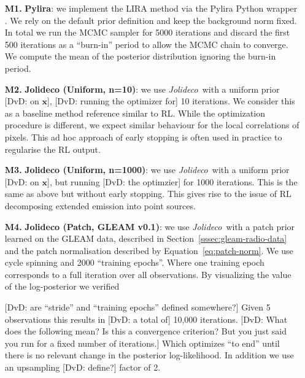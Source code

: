 \documentclass[twocolumn]{aastex631}
\newcommand{\jolideco}{\textit{Jolideco}~}
\newcommand{\dvd}[1]{{\color{red} [DvD: #1]}}
\begin{document}
    \begin{enumerate}

        \item[\bf M1.] \textbf{Pylira}: we implement the LIRA method \citep{Esch2004} via the Pylira Python wrapper \citep{Donath2022}. We rely on the default prior definition and keep the background norm fixed. In total we run the MCMC sampler for 5000 iterations and discard the first 500 iterations as a \enquote{burn-in} period to allow the MCMC chain to converge. We compute the mean of the posterior distribution ignoring the burn-in period.
        
        \item[\bf M2.] \textbf{Jolideco (Uniform, n=10)}: we use \jolideco with a uniform prior \dvd{on $\mathbf{x}$}, \dvd{running the optimizer for} 10 iterations. We consider this as a baseline method reference similar to RL. While the optimization procedure is different, we expect similar behaviour for the local correlations of pixels. This ad hoc approach of early stopping is often used in practice to regularise the RL output.
        
        \item[\bf M3.] \textbf{Jolideco (Uniform, n=1000)}:  we use \jolideco with a uniform prior \dvd{on $\mathbf{x}$}, but running \dvd{the optimzier} for 1000 iterations. This is the same as above but without early stopping. This gives rise to the issue of RL decomposing extended emission into point sources. 
        
        \item[\bf M4.] \textbf{Jolideco (Patch, GLEAM v0.1)}: we use \jolideco with a patch prior learned on the GLEAM data, described in Section~\ref{sssec:gleam-radio-data} and the patch normalisation described by Equation~\ref{eq:patch-norm}. We use cycle spinning and 2000 \enquote{training epochs}. Where one training epoch corresponds to a full iteration over all observations. By visualizing the value of the log-posterior we verified 
        
        \dvd{are ``stride'' and ``training epochs'' defined somewhere?} Given 5 observations this results in \dvd{a total of} 10,000 iterations. \dvd{What does the following mean? Is this a convergence criterion? But you just said you run for a fixed number of iterations.} Which optimizes \enquote{to end} until there is no relevant change in the posterior log-likelihood. In addition we use an upsampling \dvd{define?} factor of 2.
        

\end{enumerate}
\end{document}
